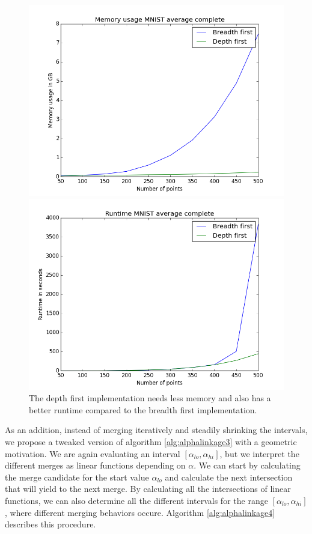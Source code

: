 \begin{figure}
\centering
\begin{minipage}{.45\textwidth}
  \centering
  \includegraphics[width=\linewidth]{plots/memory_mnist_ac}
\end{minipage}\hfill
\begin{minipage}{.45\textwidth}
  \centering
  \includegraphics[width=\linewidth]{plots/runtime_mnist_ac}
\end{minipage}
\caption{The depth first implementation needs less memory and also has a better runtime compared to the breadth first implementation.}
\label{fig:performance}
\end{figure}

As an addition, instead of merging iteratively and steadily shrinking the intervals, we propose a tweaked version of algorithm \ref{alg:alphalinkage3} with a geometric motivation. We are again evaluating an interval $[\alpha_{lo}, \alpha_{hi}]$, but we interpret the different merges as linear functions depending on $\alpha$. We can start by calculating the merge candidate for the start value $\alpha_{lo}$ and calculate the next intersection that will yield to the next merge. By calculating all the intersections of linear functions, we can also determine all the different intervals for the range $[\alpha_{lo}, \alpha_{hi}]$, where different merging behaviors occure. Algorithm \ref{alg:alphalinkage4} describes this procedure.

